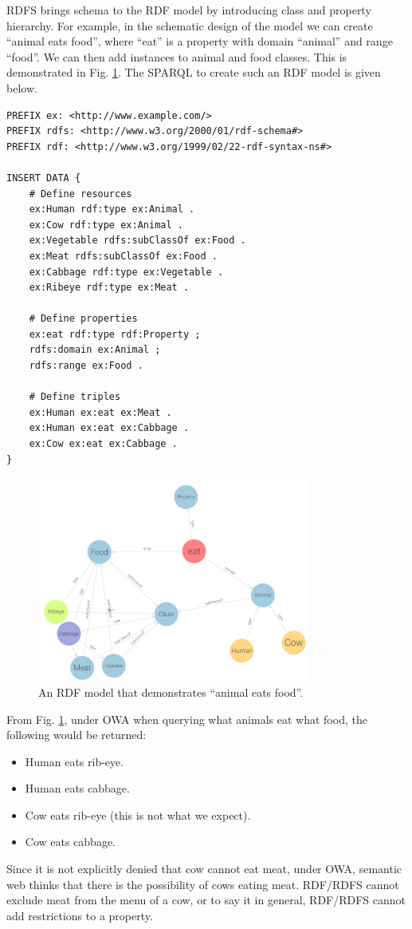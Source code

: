 RDFS brings schema to the RDF model by introducing class and property hierarchy. For example, in the schematic design of the model we can create ``animal eats food'', where ``eat'' is a property with domain ``animal'' and range ``food''. We can then add instances to animal and food classes. This is demonstrated in Fig. \ref{fig:coweatgrass}. The SPARQL to create such an RDF model is given below.
\begin{lstlisting}
PREFIX ex: <http://www.example.com/>
PREFIX rdfs: <http://www.w3.org/2000/01/rdf-schema#>
PREFIX rdf: <http://www.w3.org/1999/02/22-rdf-syntax-ns#>

INSERT DATA {
	# Define resources
	ex:Human rdf:type ex:Animal .
	ex:Cow rdf:type ex:Animal .
	ex:Vegetable rdfs:subClassOf ex:Food .
	ex:Meat rdfs:subClassOf ex:Food .
	ex:Cabbage rdf:type ex:Vegetable .
	ex:Ribeye rdf:type ex:Meat .
	
	# Define properties
	ex:eat rdf:type rdf:Property ;
	rdfs:domain ex:Animal ;
	rdfs:range ex:Food .
	
	# Define triples
	ex:Human ex:eat ex:Meat .
	ex:Human ex:eat ex:Cabbage .
	ex:Cow ex:eat ex:Cabbage .
}
\end{lstlisting}

\begin{figure}[htbp]
	\centering
	\includegraphics[width=0.8\textwidth]{./chapters/ch-semanticwebarchitecture/figures/coweatgrass.png}
	\caption{An RDF model that demonstrates ``animal eats food''.}
	\label{fig:coweatgrass}
\end{figure}

From Fig. \ref{fig:coweatgrass}, under OWA when querying what animals eat what food, the following would be returned:
\begin{itemize}
	\item Human eats rib-eye.
	\item Human eats cabbage.
	\item Cow eats rib-eye (this is not what we expect).
	\item Cow eats cabbage.
\end{itemize}
Since it is not explicitly denied that cow cannot eat meat, under OWA, semantic web thinks that there is the possibility of cows eating meat. RDF/RDFS cannot exclude meat from the menu of a cow, or to say it in general, RDF/RDFS cannot add restrictions to a property.

